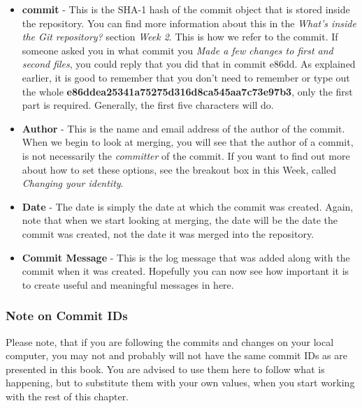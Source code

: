 \begin{itemize}
\item \textbf{commit} - This is the SHA-1 hash of the commit object that is stored inside the repository.  You can find more information about this in the \emph{What's inside the Git repository?} section \emph{Week 2}.  This is how we refer to the commit.  If someone asked you in what commit you \emph{Made a few changes to first and second files}, you could reply that you did that in commit e86dd.  As explained earlier, it is good to remember that you don't need to remember or type out the whole \textbf{e86ddea25341a75275d316d8ca545aa7c73e97b3}, only the first part is required.  Generally, the first five characters will do.
\item \textbf{Author} - This is the name and email address of the author of the commit.  When we begin to look at merging, you will see that the author of a commit, is not necessarily the \emph{committer} of the commit.  If you want to find out more about how to set these options, see the breakout box in this Week, called \emph{Changing your identity}.
\item \textbf{Date} - The date is simply the date at which the commit was created.  Again, note that when we start looking at merging, the date will be the date the commit was created, not the date it was merged into the repository.
\item \textbf{Commit Message} - This is the log message that was added along with the commit when it was created.  Hopefully you can now see how important it is to create useful and meaningful messages in here.
\end{itemize}

\begin{framed}
\subsubsection{Note on Commit IDs}
Please note, that if you are following the commits and changes on your local computer, you may not and probably will not have the same commit IDs as are presented in this book.  You are advised to use them here to follow what is happening, but to substitute them with your own values, when you start working with the rest of this chapter.
\end{framed}


